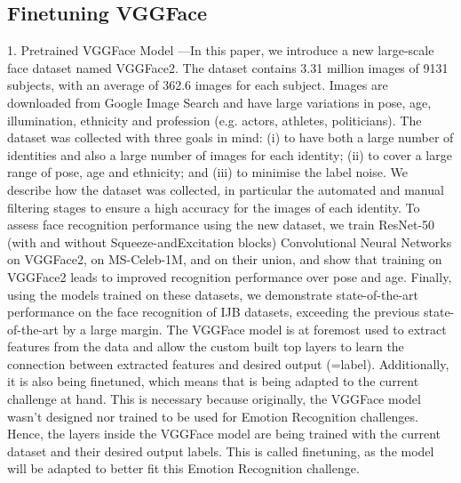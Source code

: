 \subsection{Finetuning VGGFace}

1. Pretrained VGGFace Model
—In this paper, we introduce a new large-scale face dataset named VGGFace2. The dataset contains 3.31 million images of 9131 subjects, with an average of 362.6 images for each subject. Images are downloaded from Google Image Search and have large variations in pose, age, illumination, ethnicity and profession (e.g. actors, athletes, politicians). 
The dataset was collected with three goals in mind: (i) to have both a large number of identities and also a large number of images for each identity; (ii) to cover a large range of pose, age and ethnicity; and (iii) to minimise the label noise. We describe how the dataset was collected, in particular the automated and manual filtering stages to ensure a high accuracy for the images of each identity. To assess face recognition performance using the new dataset, we train ResNet-50 (with and without Squeeze-andExcitation blocks) Convolutional Neural Networks on VGGFace2, on MS-Celeb-1M, and on their union, and show that training on VGGFace2 leads to improved recognition performance over pose and age. Finally, using the models trained on these datasets, we demonstrate state-of-the-art performance on the face recognition of IJB datasets, exceeding the previous state-of-the-art by a large margin.\cite{Cao:2018:VGGFace2}
\newline\newline
The VGGFace model is at foremost used to extract features from the data and allow the custom built top layers to learn the connection between extracted features and desired output (=label). Additionally, it is also being finetuned, which means that is being adapted to the current challenge at hand. This is necessary because originally, the VGGFace model wasn't designed nor trained to be used for Emotion Recognition challenges. Hence, the layers inside the VGGFace model are being trained with the current dataset and their desired output labels. This is called finetuning, as the model will be adapted to better fit this Emotion Recognition challenge.
